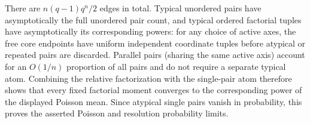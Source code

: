 There are \(n(q-1)q^n/2\) edges in total. Typical unordered pairs have asymptotically the full unordered pair count, and typical ordered factorial tuples have asymptotically its corresponding powers: for any choice of active axes, the free core endpoints have uniform independent coordinate tuples before atypical or repeated pairs are discarded. Parallel pairs (sharing the same active axis) account for an \(O(1/n)\) proportion of all pairs and do not require a separate typical atom. Combining the relative factorization with the single-pair atom therefore shows that every fixed factorial moment converges to the corresponding power of the displayed Poisson mean. Since atypical single pairs vanish in probability, this proves the asserted Poisson and resolution probability limits.
